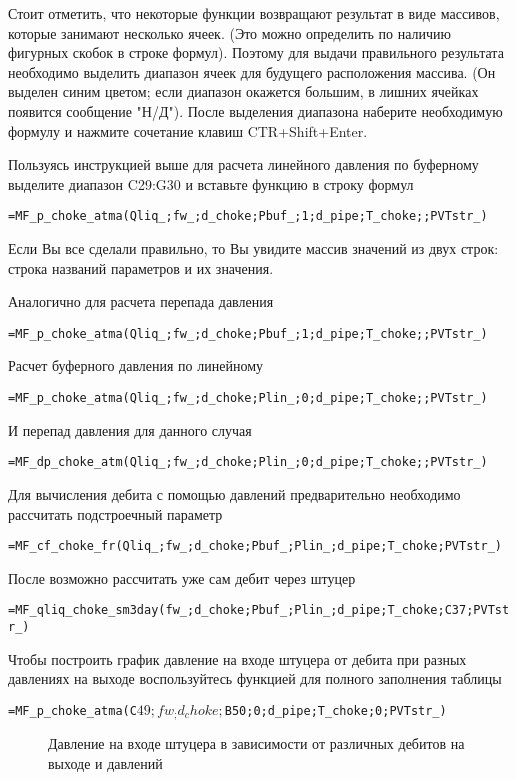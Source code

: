 Стоит отметить, что некоторые функции возвращают результат в виде массивов, которые занимают несколько ячеек. (Это можно определить по наличию фигурных скобок в строке формул). Поэтому для выдачи правильного результата необходимо выделить диапазон ячеек для будущего расположения массива. (Он выделен синим цветом; если диапазон окажется большим, в лишних ячейках появится сообщение "Н/Д"). После выделения диапазона наберите необходимую формулу и нажмите сочетание клавиш CTR+Shift+Enter.

Пользуясь инструкцией выше для расчета линейного давления по буферному выделите диапазон C29:G30 и вставьте функцию в строку формул

{ \small  \texttt{=MF\_p\_choke\_atma(Qliq\_;fw\_;d\_choke;Pbuf\_;1;d\_pipe;T\_choke;;PVTstr\_)}}

Если Вы все сделали правильно, то Вы увидите массив значений из двух строк: строка названий параметров и их значения.

Аналогично для расчета перепада давления 

{ \small  \texttt{=MF\_p\_choke\_atma(Qliq\_;fw\_;d\_choke;Pbuf\_;1;d\_pipe;T\_choke;;PVTstr\_)}}

Расчет буферного давления по линейному

{ \small  \texttt{=MF\_p\_choke\_atma(Qliq\_;fw\_;d\_choke;Plin\_;0;d\_pipe;T\_choke;;PVTstr\_)
}}

И перепад давления для данного случая

{ \small  \texttt{=MF\_dp\_choke\_atm(Qliq\_;fw\_;d\_choke;Plin\_;0;d\_pipe;T\_choke;;PVTstr\_)
}}

Для вычисления дебита с помощью давлений предварительно необходимо рассчитать подстроечный параметр

{ \small  \texttt{=MF\_cf\_choke\_fr(Qliq\_;fw\_;d\_choke;Pbuf\_;Plin\_;d\_pipe;T\_choke;PVTstr\_)
}}

После возможно рассчитать уже сам дебит через штуцер

{ \small  \texttt{=MF\_qliq\_choke\_sm3day(fw\_;d\_choke;Pbuf\_;Plin\_;d\_pipe;T\_choke;C37;PVTstr\_)
}}

Чтобы построить график давление на входе штуцера от дебита при разных давлениях на выходе воспользуйтесь функцией для полного заполнения таблицы

{ \small  \texttt{=MF\_p\_choke\_atma(C$49;fw_;d_choke;$B50;0;d\_pipe;T\_choke;0;PVTstr\_)
}}


\begin{figure}[h!]
	\center{\texttt{[image: Ex40\_3]}}
	\caption{Давление на входе штуцера в зависимости от различных дебитов на выходе и давлений}
	\label{ris:Ex40_3}
\end{figure}


